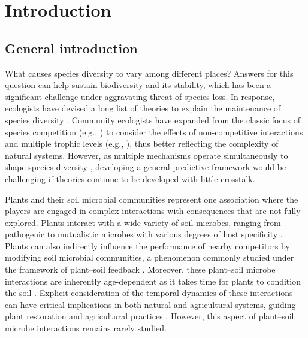 \chapter{Introduction}
\fancyhead[LE, RO]{\thepage}
\fancyfoot{}
\renewcommand{\headrulewidth}{0pt}
\setlength{\parindent}{1cm}


\section{General introduction}
What causes species diversity to vary among different places? Answers for this question can help sustain biodiversity and its stability, which has been a significant challenge under aggravating threat of species loss. In response, ecologists have devised a long list of theories to explain the maintenance of species diversity \citep{Vellend2016}. Community ecologists have expanded from the classic focus of species competition (e.g., \citealp{Gause1934}) to consider the effects of non-competitive interactions and multiple trophic levels (e.g., \citealp{Chesson2008b, Mccann2011, Bascompte2013}), thus better reflecting the complexity of natural systems. However, as multiple mechanisms operate simultaneously to shape species diversity \citep{Amarasekare2007}, developing a general predictive framework would be challenging if theories continue to be developed with little crosstalk.
\par


Plants and their soil microbial communities represent one association where the players are engaged in complex interactions with consequences that are not fully explored. Plants interact with a wide variety of soil microbes, ranging from pathogenic to mutualistic microbes with various degrees of host specificity \citep{Bever2010, vanderPutten2013}. Plants can also indirectly influence the performance of nearby competitors by modifying soil microbial communities, a phenomenon commonly studied under the framework of plant--soil feedback \citep{Bever1997, Bever2003}. Moreover, these plant--soil microbe interactions are inherently age-dependent as it takes time for plants to condition the soil \citep{Kardol2013}. Explicit consideration of the temporal dynamics of these interactions can have critical implications in both natural and agricultural systems, guiding plant restoration and agricultural practices \citep{Kulmatiski2006, Mariotte2018}. However, this aspect of plant--soil microbe interactions remains rarely studied. 
\par 


